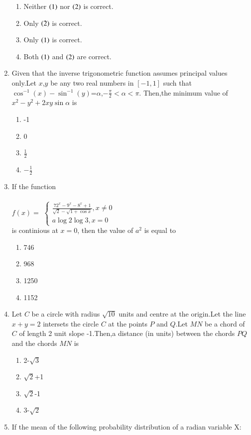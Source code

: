 \documentclass[journal,12pt,onecolumn]{IEEEtran}
\theoremstyle{remark}
\begin{document}
\begin{enumerate}
\begin{enumerate}
\item Neither $\left(1\right)$ nor $\left(2\right)$ is correct. 
\item Only $\left(2\right)$ is correct.
\item Only $\left(1\right)$ is correct. 
\item Both $\left(1\right)$ and $\left(2\right)$ are correct.
\end{enumerate}
\item Given that the inverse trigonometric function assumes principal values only.Let $x$,$y$ be any two real numbers in $[-1,1]$ such that  $\cos^{-1}(x)-\sin^{-1}(y)$=$\alpha $,$-\frac{\pi}{2}<\alpha<\pi$.
Then,the minimum value of $x^2-y^2+2xy\sin{\alpha}$ is 
\begin{enumerate}
\item -1
\item 0
\item $\frac{1}{2}$
\item $-\frac{1}{2}$
\end{enumerate}
\item If the function\\
\\$f(x)=$
$ \begin{cases}
   \frac{72^x-9^x-8^x+1}{\sqrt{2}-\sqrt{1+\cos{x}}},x \neq 0\\
    a\log2\log3,x=0
\end{cases} $ \\
is continious at $x=0$, then the value of $a^2$ is equal to 
\begin{enumerate}
\item 746
\item 968 
\item 1250
\item 1152
\end{enumerate}
\item Let $C$ be a circle with radius $\sqrt{10}$ units and centre at the origin.Let the line $x+y=2$ intersets the circle $C$ at the points $P$ and $Q$.Let $MN$ be a chord of $C$ of length 2 unit slope -1.Then,a distance (in units) between the chords $PQ$ and the chords $MN$ is
\begin{enumerate}
\item 2-$\sqrt{3}$
\item $\sqrt{2}$+1 
\item $\sqrt{2}$-1
\item 3-$\sqrt{2}$
\end{enumerate}
\item If the mean of the following probability distribution of a radian variable X:\\


\end{enumerate}
\end{document}
